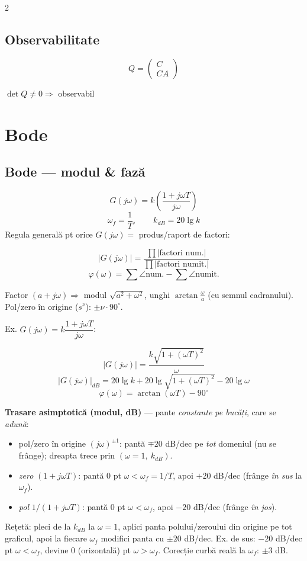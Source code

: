 \documentclass[8pt,a4paper]{extarticle}
\begin{document}
\begin{multicols}{2}
\subsection{Observabilitate}
$$Q=\begin{pmatrix}C\\CA\end{pmatrix}$$
\begin{keyeq}
$\det Q\ne0 \Rightarrow$ observabil
\end{keyeq}

\section{Bode}

\subsection{Bode --- modul \& fază}
$$G(j\omega)=k\left(\frac{1+j\omega T}{j\omega}\right)$$
$$\omega_f=\frac1T,\qquad k_{dB}=20\lg k$$
Regula generală pt orice $G(j\omega)=$ produs/raport de factori:
\begin{keyeq}
$$|G(j\omega)|=\dfrac{\prod|\text{factori num.}|}{\prod|\text{factori numit.}|}$$
$$\varphi(\omega)=\sum\angle\text{num.} - \sum\angle\text{numit.}$$
\end{keyeq}
Factor $(a+j\omega) \Rightarrow$ modul $\sqrt{a^2+\omega^2}$, unghi $\arctan\frac{\omega}{a}$ (cu semnul cadranului). Pol/zero în origine ($s^\nu$): $\pm\nu\cdot90^\circ$.

Ex. $G(j\omega)=k\dfrac{1+j\omega T}{j\omega}$:
\begin{keyeq}
$$|G(j\omega)|=\dfrac{k\sqrt{1+(\omega T)^2}}{\omega}$$
$$|G(j\omega)|_{dB}=20\lg k+20\lg\sqrt{1+(\omega T)^2}-20\lg\omega$$
$$\varphi(\omega)=\arctan(\omega T)-90^\circ$$
\end{keyeq}

\textbf{Trasare asimptotică (modul, dB)} --- pante \emph{constante pe bucăți}, care se \emph{adună}:
\begin{itemize}
\item pol/zero în origine $(j\omega)^{\pm1}$: pantă $\mp20$ dB/dec pe \emph{tot} domeniul (nu se frânge); dreapta trece prin $(\omega{=}1,\ k_{dB})$.
\item \emph{zero} $(1{+}j\omega T)$: pantă $0$ pt $\omega{<}\omega_f{=}1/T$, apoi $+20$ dB/dec (frânge \emph{în sus} la $\omega_f$).
\item \emph{pol} $1/(1{+}j\omega T)$: pantă $0$ pt $\omega{<}\omega_f$, apoi $-20$ dB/dec (frânge \emph{în jos}).
\end{itemize}
Rețetă: pleci de la $k_{dB}$ la $\omega{=}1$, aplici panta polului/zeroului din origine pe tot graficul, apoi la fiecare $\omega_f$ modifici panta cu $\pm20$ dB/dec. Ex. de sus: $-20$ dB/dec pt $\omega{<}\omega_f$, devine $0$ (orizontală) pt $\omega{>}\omega_f$. Corecție curbă reală la $\omega_f$: $\pm3$ dB.


\end{multicols}
\end{document}
